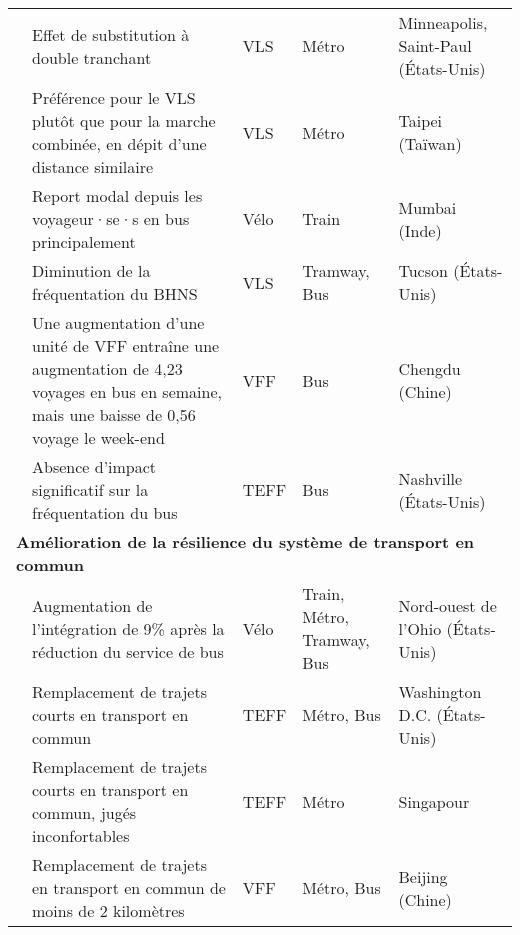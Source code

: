 \begin{longtable}{p{3cm}p{4cm}p{1.5cm}p{1.8cm}p{2.3cm}}
    \small{\textcite{song_investigating_2020}}\index{Song, Ying|pagebf} & \small{Effet de substitution à double tranchant} & \small{VLS} & \small{Métro} & \small{Minneapolis, Saint-Paul (États-Unis)}\\
    \small{\textcite{yen_how_2023}}\index{Yen, Barbara T.H.|pagebf} & \small{Préférence pour le VLS plutôt que pour la marche combinée, en dépit d'une distance similaire} & \small{VLS} & \small{Métro} & \small{Taipei (Taïwan)}\\
    \small{\textcite{rastogi_willingness_2010}}\index{Rastogi, Rajat|pagebf} & \small{Report modal depuis les voyageur·se·s en bus principalement} & \small{Vélo} & \small{Train} & \small{Mumbai (Inde)}\\
    \small{\textcite{li_investigating_2022}}\index{Li, Xiaofeng|pagebf} & \small{Diminution de la fréquentation du BHNS} & \small{VLS} & \small{Tramway, Bus} & \small{Tucson (États-Unis)}\\
    \small{\textcite{ma_impacts_2019}}\index{Ma, Xiaolei|pagebf} & \small{Une augmentation d'une unité de VFF entraîne une augmentation de 4,23 voyages en bus en semaine, mais une baisse de 0,56 voyage le week-end} & \small{VFF} & \small{Bus} & \small{Chengdu (Chine)}\\
    \small{\textcite{ziedan_complement_2021}}\index{Ziedan, Abubakr|pagebf} & \small{Absence d'impact significatif sur la fréquentation du bus} & \small{TEFF} & \small{Bus} & \small{Nashville (États-Unis)}\\
    \hline
\multicolumn{5}{l}{\textbf{Amélioration de la résilience du système de transport en commun}}\\
    \small{\textcite{flamm_changes_2014}}\index{Flamm, Bradley J.|pagebf} & \small{Augmentation de l'intégration de 9\% après la réduction du service de bus} & \small{Vélo} & \small{Train, Métro, Tramway, Bus} & \small{Nord-ouest de l'Ohio (États-Unis)}\\
    \small{\textcite{yan_spatiotemporal_2021}}\index{Yan Xiang|pagebf} & \small{Remplacement de trajets courts en transport en commun} & \small{TEFF} & \small{Métro, Bus} & \small{Washington D.C. (États-Unis)}\\
    \small{\textcite{cao_e-scooter_2021}}\index{Cao, Zhejing|pagebf} & \small{Remplacement de trajets courts en transport en commun, jugés inconfortables} & \small{TEFF} & \small{Métro} & \small{Singapour}\\
    \small{\textcite{jin_competition_2019}}\index{Jin, Haitao|pagebf} & \small{Remplacement de trajets en transport en commun de moins de 2 kilomètres} & \small{VFF} & \small{Métro, Bus} & \small{Beijing (Chine)}\\

\end{longtable}
